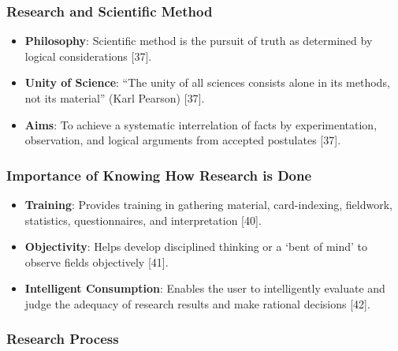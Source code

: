 \documentclass[
]{article}
\providecommand{\tightlist}{%
  \setlength{\itemsep}{0pt}\setlength{\parskip}{0pt}}
\begin{document}
\subsubsection{Research and Scientific
Method}\label{research-and-scientific-method}

\begin{itemize}
\tightlist
\item
  \textbf{Philosophy}: Scientific method is the pursuit of truth as
  determined by logical considerations {[}37{]}.
\item
  \textbf{Unity of Science}: ``The unity of all sciences consists alone
  in its methods, not its material'' (Karl Pearson) {[}37{]}.
\item
  \textbf{Aims}: To achieve a systematic interrelation of facts by
  experimentation, observation, and logical arguments from accepted
  postulates {[}37{]}.
\end{itemize}

\subsubsection{Importance of Knowing How Research is
Done}\label{importance-of-knowing-how-research-is-done}

\begin{itemize}
\tightlist
\item
  \textbf{Training}: Provides training in gathering material,
  card-indexing, fieldwork, statistics, questionnaires, and
  interpretation {[}40{]}.
\item
  \textbf{Objectivity}: Helps develop disciplined thinking or a `bent of
  mind' to observe fields objectively {[}41{]}.
\item
  \textbf{Intelligent Consumption}: Enables the user to intelligently
  evaluate and judge the adequacy of research results and make rational
  decisions {[}42{]}.
\end{itemize}

\subsubsection{Research Process}\label{research-process}
\end{document}
